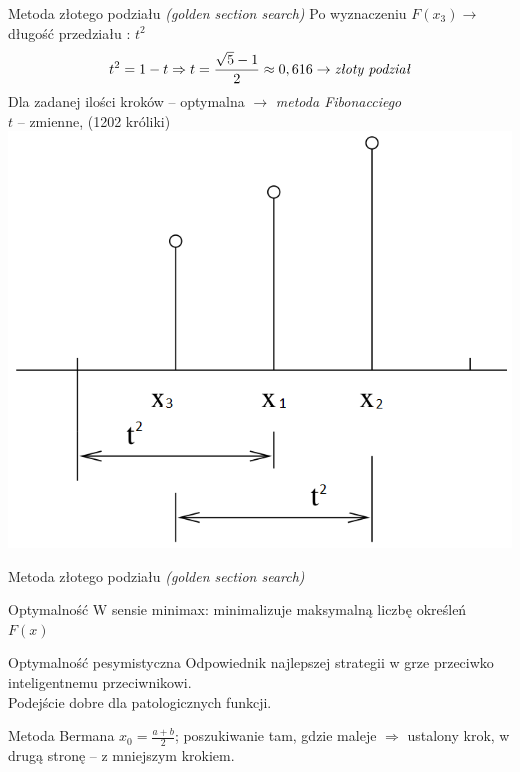   \begin{frame}{Metoda złotego podziału \emph{(golden section search)}}
    Po wyznaczeniu $F(x_3) \to$ długość przedziału : $t^{2}$
    \begin{displaymath}
      t^{2} = 1 - t \Rightarrow t = \frac{\sqrt{5} - 1}{2} \approx 0,616 \to \text{\emph{złoty podział}}
    \end{displaymath}
    Dla zadanej ilości kroków -- optymalna $\to$ \emph{metoda Fibonacciego}\\
    $t$ -- zmienne, (1202 króliki)\\
    \centering
    \includegraphics[height=0.55\textheight]{img/17/fibb}
  \end{frame}

  \begin{frame}{Metoda złotego podziału \emph{(golden section search)}}
    \begin{block}{Optymalność}
      W sensie minimax: minimalizuje maksymalną liczbę określeń
      $F(x)$
    \end{block}
    \begin{block}{Optymalność pesymistyczna}
      Odpowiednik najlepszej strategii w grze przeciwko
      inteligentnemu przeciwnikowi.\\
      Podejście dobre dla patologicznych funkcji.
    \end{block}
    \begin{block}{Metoda Bermana}
      $x_{0} = \frac{a + b}{2}$; poszukiwanie tam, gdzie maleje
      $\Rightarrow$ ustalony krok, w drugą stronę -- z mniejszym krokiem.
    \end{block}
  \end{frame}

